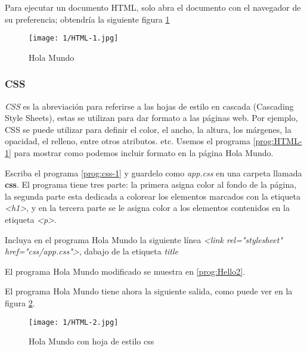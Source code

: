 Para ejecutar un documento HTML, solo abra el documento con el navegador de su preferencia;
obtendría la siguiente figura \ref{fig:HTML-1}

	\begin{figure} %
	\texttt{[image: 1/HTML-1.jpg]}
	\caption{Hola Mundo}
	\label{fig:HTML-1}
\end{figure}

\subsubsection{CSS} 
\textit{CSS} es la abreviación para referirse a las hojas de estilo en cascada (Cascading Style Sheets), estas se utilizan  para dar formato a las páginas web. Por ejemplo, \gls{CSS}
se puede utilizar para definir el color, el ancho, la altura, los márgenes, la opacidad, el relleno, entre otros atributos. etc.
Usemos el programa \ref{prog:HTML-1} para mostrar como podemos incluir formato en la p\'agina Hola Mundo. 

 Escriba el programa \ref{prog:css-1} y guardelo como \textit{app.css} en una carpeta  llamada \textbf{css}. El programa tiene tres parte: la primera asigna color al fondo de la página, la segunda parte esta dedicada a colorear los elementos marcados con la etiqueta \textit{<h1>}, y en la tercera parte se le asigna color a los elementos contenidos en la etiqueta \textit{<p>}.
 
      \label{prog:css-1}
    
     Incluya en el programa Hola Mundo  la siguiente línea  \textit{<link rel="stylesheet" href="css/app.css">}, dabajo de la etiqueta \textit{title}
     
     El programa Hola Mundo modificado se muestra en \ref{prog:Hello2}. 
     
     \label{prog:Hello2}
 
 El programa Hola Mundo tiene ahora la siguiente salida, como puede ver en la figura \ref{fig:HTML-2}. 
 
 \begin{figure} %
 	\texttt{[image: 1/HTML-2.jpg]}
 	\caption{Hola Mundo con hoja de estilo css}
 	\label{fig:HTML-2}
 \end{figure}


